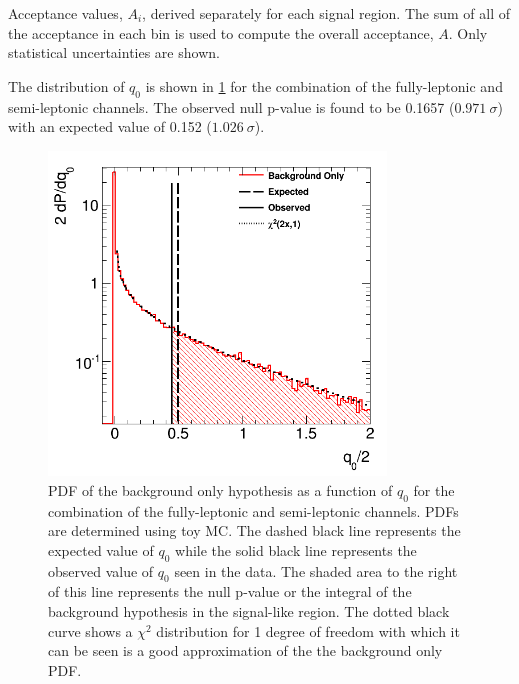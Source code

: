 \begin{table}[ht!]
\centering

\caption{Acceptance values, $A_i$, derived separately for each signal region. 
The sum of all of the acceptance
in each bin is used to compute the overall acceptance, $A$. 
Only statistical uncertainties are shown.}
\label{tab:acceptance}
\end{table}


The distribution of $q_0$ is shown 
in \fig\ref{fig:stat_measurement_significance} for the combination of the fully-leptonic and
semi-leptonic channels.
The observed null p-value 
is found to be 0.1657 ($0.971~\sigma$) with an 
expected value of 0.152 ($1.026~\sigma$).

\begin{figure}[ht!]
\centering
\includegraphics[width=0.80\textwidth]{figures/combination/significance.png}
\caption{PDF of the background only hypothesis as a function of $q_0$ for the combination of the fully-leptonic and semi-leptonic channels. PDFs are determined 
using toy MC. The dashed black line represents the expected value of $q_0$ while the solid black line represents the observed value of $q_0$ seen in the data. The shaded area to the right
of this line represents the null p-value or the 
integral of the background hypothesis in the signal-like region.
The dotted black curve shows a $\chi^2$ distribution for 1 degree of freedom with which 
it can be seen is a good approximation of the 
the background only PDF.}
\label{fig:stat_measurement_significance}
\end{figure}


